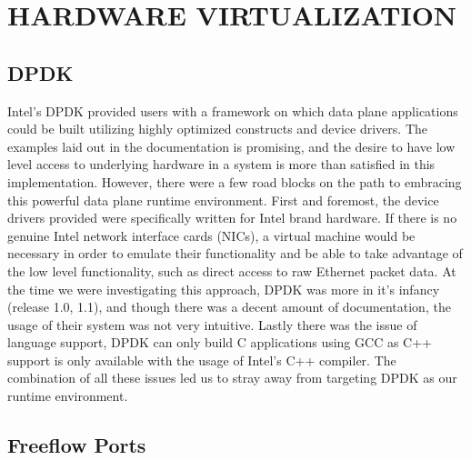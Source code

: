\chapter{HARDWARE VIRTUALIZATION}
\label{hardware}


\section{DPDK}
\label{hardware:dpdk}
Intel's DPDK provided users with a framework on which data plane applications
could be built utilizing highly optimized constructs and device drivers. The
examples laid out in the documentation is promising, and the desire to have
low level access to underlying hardware in a system is more than satisfied
in this implementation. However, there were a few road blocks on the path to
embracing this powerful data plane runtime environment. First and foremost, the
device drivers provided were specifically written for Intel brand hardware. If
there is no genuine Intel network interface cards (NICs), a virtual machine
would be necessary in order to emulate their functionality and be able to take
advantage of the low level functionality, such as direct access to raw
Ethernet packet data. At the time we were investigating this approach, DPDK was
more in it's infancy (release 1.0, 1.1), and though there was a decent amount
of documentation, the usage of their system was not very intuitive. Lastly
there was the issue of language support, DPDK can only build C applications
using GCC as C++ support is only available with the usage of Intel's C++
compiler. The combination of all these issues led us to stray away from
targeting DPDK as our runtime environment.

\section{Freeflow Ports}
\label{hardware:ffports}